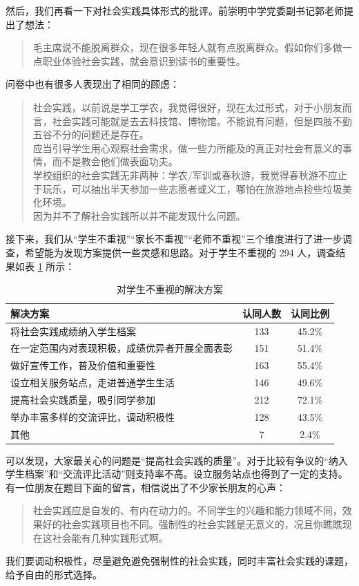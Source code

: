 \documentclass[12pt,UTF8]{ctexart}
\begin{document}
\par {
	然后，我们再看一下对社会实践具体形式的批评。前崇明中学党委副书记郭老师提出了想法：
	\begin{quote}
		\kaishu 毛主席说不能脱离群众，现在很多年轻人就有点脱离群众。假如你们多做一点职业体验社会实践，就会意识到读书的重要性。
	\end{quote}
	问卷中也有很多人表现出了相同的顾虑：
	\begin{quote}
		\kaishu
		社会实践，以前说是学工学农，我觉得很好，现在太过形式，对于小朋友而言，社会实践可能就是去去科技馆、博物馆。不能说有问题，但是四肢不勤五谷不分的问题还是存在。\\
		应当引导学生用心观察社会需求，做一些力所能及的真正对社会有意义的事情，而不是教会他们做表面功夫。\\
		学校组织的社会实践无非两种：学农/军训或春秋游，我觉得春秋游不应止于玩乐，可以抽出半天参加一些志愿者或义工，哪怕在旅游地点捡些垃圾美化环境。\\
		因为并不了解社会实践所以并不能发现什么问题。\\
	\end{quote}
}
\par {
	接下来，我们从“学生不重视”“家长不重视”“老师不重视”三个维度进行了进一步调查，希望能为发现方案提供一些灵感和思路。对于学生不重视的 294
	人，调查结果如表 \ref{fig:11} 所示：
	\begin{table}[htbp]
		\centering
		\caption{对学生不重视的解决方案}
		\label{fig:11}
		\begin{tabular}{lcc}
			\hline
			\hline
			{\bf 解决方案} & {\bf 认同人数} & {\bf 认同比例}\\ \hline
			将社会实践成绩纳入学生档案 & 133 & 45.2\% \\
			在一定范围内对表现积极，成绩优异者开展全面表彰 & 151 & 51.4\% \\
			做好宣传工作，普及价值和重要性 & 163 & 55.4\% \\
			设立相关服务站点，走进普通学生生活 & 146 & 49.6\% \\
			提高社会实践质量，吸引同学参加 & 212 & 72.1\% \\
			举办丰富多样的交流评比，调动积极性 & 128 & 43.5\% \\
			其他 & 7 & 2.4\% \\
			\hline
			\hline
		\end{tabular}
	\end{table}
}
\par {
	
	可以发现，大家最关心的问题是“提高社会实践的质量”。对于比较有争议的“纳入学生档案”和“交流评比活动”则支持率不高。设立服务站点也得到了一定的支持。有一位朋友在题目下面的留言，相信说出了不少家长朋友的心声：
	\begin{quote}
		\kaishu
		社会实践应是自发的、有内在动力的。不同学生的兴趣和能力领域不同，效果好的社会实践项目也不同。强制性的社会实践是无意义的，况且你瞧瞧现在这社会能有几种实践形式啊。
	\end{quote}
	我们要调动积极性，尽量避免避免强制性的社会实践，同时丰富社会实践的课题，给予自由的形式选择。
}
\end{document}
